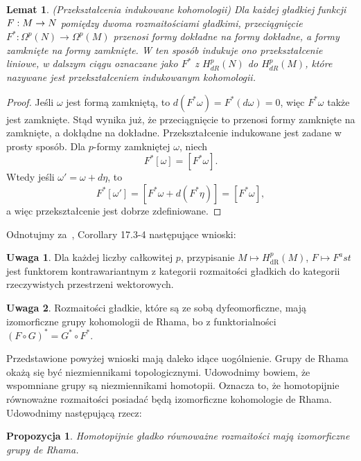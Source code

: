 \documentclass[licencjacka]{pracamgr}
\theoremstyle{definition}
\theoremstyle{definition}
\newtheorem{remark}{Uwaga}[section]
\theoremstyle{plain}
\newtheorem{lemma}{Lemat}[section]
\theoremstyle{plain}
\newtheorem{proposition}{Propozycja}[section]
\theoremstyle{plain}
\theoremstyle{plain}
\def\M{\ensuremath M}
\begin{document}
\begin{lemma}(Przekształcenia indukowane kohomologii)
  Dla każdej gładkiej funkcji $F: \M \rightarrow N$ pomiędzy
  dwoma rozmaitościami gładkimi, przeciągnięcie 
  $F^\ast: \Omega^p(N) \rightarrow \Omega^p (M)$ przenosi formy dokładne
  na formy dokładne, a formy zamknięte na formy zamknięte. W ten sposób indukuje
  ono przekształcenie liniowe, w dalszym ciągu oznaczane jako $F^\ast$ z
  $H^p_{dR} (N)$ do $H^p_{dR} (M)$, które nazywane jest przekształceniem indukowanym
  kohomologii. \\
\end{lemma}
\begin{proof}
  Jeśli $\omega$ jest formą zamkniętą, to $d(F^\ast \omega) = F^\ast(d \omega) = 0$,
  więc $F^\ast \omega$ także jest zamknięte. Stąd wynika już, że przeciągnięcie
  to przenosi formy zamknięte na zamknięte, a dokłądne na dokładne. Przekształcenie
  indukowane jest zadane w prosty sposób. Dla $p$-formy zamkniętej $\omega$, niech
  \[
  F^\ast[\omega] = [F^\ast\omega].
  \]
  Wtedy jeśli $\omega' = \omega + d \eta$, to 
  \[
  F^\ast[\omega'] = [F^\ast\omega + d(F^\ast\eta)] = [F^\ast\omega],
  \]
  a więc przekształcenie jest dobrze zdefiniowane.
\end{proof} 
Odnotujmy za~\cite{Lee}, Corollary 17.3-4 następujące wnioski:
\begin{remark}
Dla każdej liczby całkowitej $p$, przypisanie $M \mapsto H_{\text{dR}}^p(M)$,
$F \mapsto F^ast$ jest funktorem kontrawariantnym z kategorii
rozmaitości gładkich do kategorii rzeczywistych przestrzeni wektorowych.
\end{remark}
\begin{remark}
  Rozmaitości gładkie, które są ze sobą dyfeomorficzne, mają izomorficzne grupy
  kohomologii de Rhama, bo z funktorialności
  $(F \circ G)^\ast = G^\ast \circ F^\ast$.
\end{remark}


Przedstawione powyżej wnioski mają daleko idące uogólnienie. Grupy de Rhama
okażą się być niezmiennikami topologicznymi.  Udowodnimy bowiem, że wspomniane
grupy są niezmiennikami homotopii.  Oznacza to, że homotopijnie równoważne
rozmaitości posiadać będą izomorficzne kohomologie de Rhama. Udowodnimy
następującą rzecz:

\begin{proposition}\label{homotopy-de-Rham}
    Homotopijnie gładko równoważne rozmaitości mają izomorficzne grupy de Rhama.
\end{proposition}
\end{document}
